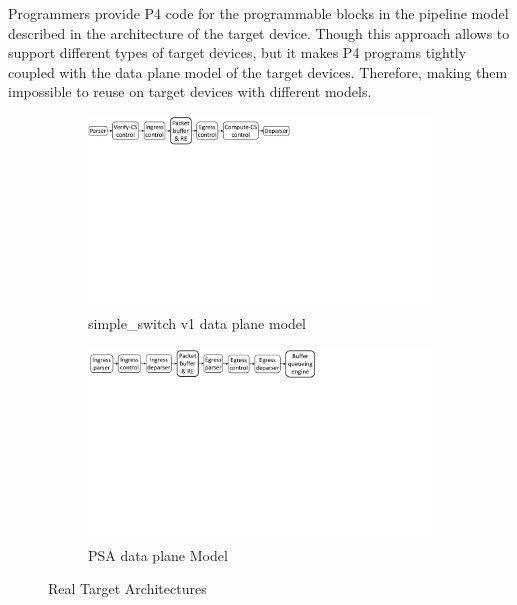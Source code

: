 Programmers provide P4 code for the programmable blocks in the pipeline model described in the architecture of the target device.
Though this approach allows to support different types of target devices, but it makes P4 programs tightly coupled with the data plane model of the target devices. 
Therefore, making them impossible to reuse on target devices with different models. 
\begin{figure}[ht]
    \begin{subfigure}[b]{\linewidth}
        \centering
        \includegraphics[trim=2 460 380 0, clip,scale=0.37]{v1model-pipeline.pdf}
        \caption{simple\_switch v1 data plane model}
        \label{subfig:v1model}
    \end{subfigure}
    \begin{subfigure}{\linewidth}
        \centering
        \includegraphics[trim=2 450 281 0, clip,scale=0.37]{psa-pipeline.pdf}
        \caption{PSA data plane Model}
        \label{subfig:psa-model}
    \end{subfigure}
\caption{Real Target Architectures}
\label{fig:real-target-architectures}
\end{figure}

